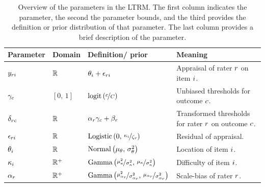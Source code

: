 \documentclass[a4paper,usenames,dvipsnames]{article}
\newenvironment{revision}{\color{teal}}{\color{black}}
\begin{document}
\begin{revision}

	\begin{table}[!ht]

	\centering
	\caption{\begin{revision}Overview of the parameters in the LTRM. The first column indicates the parameter, the second the parameter bounds, and the third provides the definition or prior distribution of that parameter. The last column provides a brief description of the parameter.\end{revision}}%

	\label{tb:LTRMparameterOverview}

	\begin{tabular}{llll}

	\toprule

	Parameter & Domain & Definition/ prior & Meaning\\

	\midrule

	$y_{ri}		$&$	\mathbb{R}			$&$\theta_i + \epsilon_{ri}$&
	\makecell[l]{Appraisal of rater $r$\\on item $i$.}\\

	$\gamma_c 		$&$	[0,\,1]			$&$\logit{\nicefrac{\Incat}{\Tncat}}$&
	\makecell[l]{Unbiased thresholds for\\outcome $c$.}\\

	$\delta_{rc} 	$&$	\mathbb{R}			$&$\alpha_r \gamma_c + \beta_r$&
	\makecell[l]{Transformed thresholds\\for rater $r$ on outcome $c$.}\\

	$\epsilon_{ri}   		$&$	\mathbb{R}			$&$\text{Logistic}\left(0,\,\nicefrac{\kappa_i}{\zeta_r}\right) $&
	Residual of appraisal.\\

	$\theta_i        		$&$	\mathbb{R}			$&$\text{Normal}\left(\mu_\theta,\,\sigma_\theta^2\right)$&
	Location of item $i$.\\

	$\kappa_i   		$&$	\mathbb{R}^+	$&$\text{Gamma}\left(\nicefrac{\mu_\kappa^2}{\sigma_\kappa^2},\,\nicefrac{\mu_\kappa}{\sigma_\kappa^2}\right) $&
	Difficulty of item $i$.\\

	$\alpha_r      		$&$	\mathbb{R}^+	$&$\text{Gamma}\left(\nicefrac{\mu_{\alpha_r}^2}{\sigma_{\alpha_r}^2},\,\nicefrac{\mu_{\alpha_r}}{\sigma_{\alpha_r}^2}\right) $&
	Scale-bias of rater $r$.\\


\end{tabular}
\end{table}
\end{revision}
\end{document}

